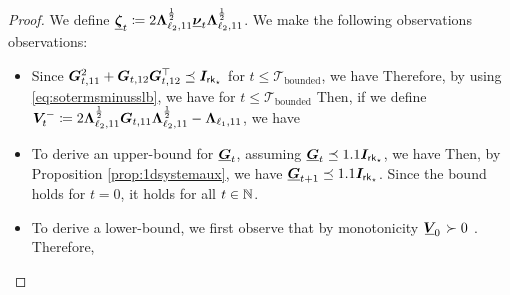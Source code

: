 \begin{proof}
We define $\underline{\boldsymbol{\zeta}}_{t}   \coloneqq 2  \boldsymbol{\Lambda}_{\ell_2,11}^{\frac{1}{2}} \underline{\boldsymbol{\nu}}_{t}  \boldsymbol{\Lambda}_{\ell_2,11}^{\frac{1}{2}} $.  We make the following observations observations:
\begin{itemize}[leftmargin=*]
\item Since  $\boldsymbol{G}_{t,11}^2 + \boldsymbol{G}_{t,12} \boldsymbol{G}_{t,12}^\top \preceq \boldsymbol{I}_{\mathsf{rk}_{\star}}$  for   $t \leq   \mathcal{T}_{\text{bounded}}$, we have
Therefore, by  using   \eqref{eq:sotermsminusslb}, we have for $t \leq \mathcal{T}_{\text{bounded}}$ 
Then, if we define $\boldsymbol{V}_{t}^{-} \coloneqq   2 \boldsymbol{\Lambda}_{\ell_2,11}^{\frac{1}{2}} \boldsymbol{G}_{t,11}  \boldsymbol{\Lambda}_{\ell_2,11}^{\frac{1}{2}} -   \boldsymbol{\Lambda}_{\ell_1,11}$, we have
\item To derive an upper-bound for $\underline{\boldsymbol{G}}_{t}$,  assuming $\underline{\boldsymbol{G}}_{t} \preceq 1.1 \boldsymbol{I}_{\mathsf{rk}_{\star}}$,  we have
Then,  by Proposition   \ref{prop:1dsystemaux}, we have  $\underline{\boldsymbol{G}}_{t+1} \preceq 1.1 \boldsymbol{I}_{\mathsf{rk}_{\star}}$.  Since the bound holds for $t = 0$, it holds for all $t \in \mathbb{N}$. 
\item  To derive a lower-bound,  we first observe that by monotonicity $\mspace{2.2mu}\underline{\mspace{-2.2mu}\boldsymbol{V}\mspace{-2.2mu}}_{0} \mspace{2.2mu} \succ 0$ . Therefore,
\end{itemize}
\end{proof}
